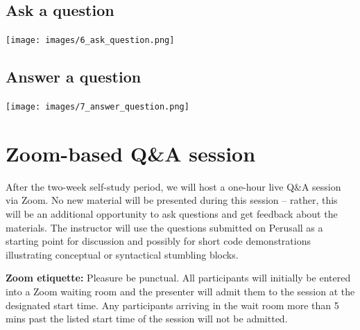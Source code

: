 \documentclass[]{book}
\begin{document}
\hypertarget{ask-a-question}{%
\section{Ask a question}\label{ask-a-question}}

\texttt{[image: images/6\_ask\_question.png]}

\hypertarget{answer-a-question}{%
\section{Answer a question}\label{answer-a-question}}

\texttt{[image: images/7\_answer\_question.png]}

\hypertarget{zoom-based-qa-session}{%
\chapter*{Zoom-based Q\&A session}\label{zoom-based-qa-session}}

After the two-week self-study period, we will host a one-hour live Q\&A session via Zoom. No new material will be presented during this session -- rather, this will be an additional opportunity to ask questions and get feedback about the materials. The instructor will use the questions submitted on Perusall as a starting point for discussion and possibly for short code demonstrations illustrating conceptual or syntactical stumbling blocks.

\textbf{Zoom etiquette:} Pleasure be punctual. All participants will initially be entered into a Zoom waiting room and the presenter will admit them to the session at the designated start time. Any participants arriving in the wait room more than 5 mins past the listed start time of the session will not be admitted.
\end{document}
